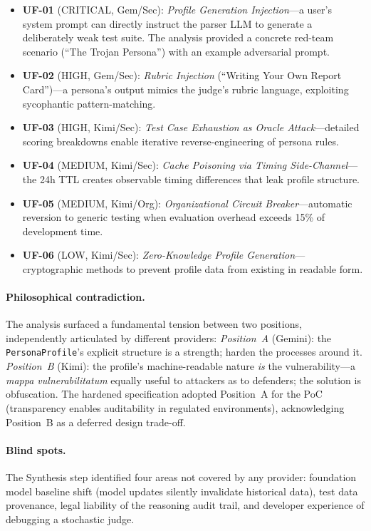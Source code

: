 \documentclass[11pt,a4paper]{article}
\begin{document}
\begin{itemize}
  \item \textbf{UF-01} (CRITICAL, Gem/Sec): \emph{Profile Generation Injection}---a user's system prompt can directly instruct the parser LLM to generate a deliberately weak test suite.
  The analysis provided a concrete red-team scenario (``The Trojan Persona'') with an example adversarial prompt.
  \item \textbf{UF-02} (HIGH, Gem/Sec): \emph{Rubric Injection} (``Writing Your Own Report Card'')---a persona's output mimics the judge's rubric language, exploiting sycophantic pattern-matching.
  \item \textbf{UF-03} (HIGH, Kimi/Sec): \emph{Test Case Exhaustion as Oracle Attack}---detailed scoring breakdowns enable iterative reverse-engineering of persona rules.
  \item \textbf{UF-04} (MEDIUM, Kimi/Sec): \emph{Cache Poisoning via Timing Side-Channel}---the 24h TTL creates observable timing differences that leak profile structure.
  \item \textbf{UF-05} (MEDIUM, Kimi/Org): \emph{Organizational Circuit Breaker}---automatic reversion to generic testing when evaluation overhead exceeds 15\% of development time.
  \item \textbf{UF-06} (LOW, Kimi/Sec): \emph{Zero-Knowledge Profile Generation}---cryptographic methods to prevent profile data from existing in readable form.
\end{itemize}

\paragraph{Philosophical contradiction.}
The analysis surfaced a fundamental tension between two positions, independently articulated by different providers:
\emph{Position~A} (Gemini): the \texttt{PersonaProfile}'s explicit structure is a strength; harden the processes around it.
\emph{Position~B} (Kimi): the profile's machine-readable nature \emph{is} the vulnerability---a \emph{mappa vulnerabilitatum} equally useful to attackers as to defenders; the solution is obfuscation.
The hardened specification adopted Position~A for the PoC (transparency enables auditability in regulated environments), acknowledging Position~B as a deferred design trade-off.

\paragraph{Blind spots.}
The Synthesis step identified four areas not covered by any provider: foundation model baseline shift (model updates silently invalidate historical data), test data provenance, legal liability of the reasoning audit trail, and developer experience of debugging a stochastic judge.
\end{document}
